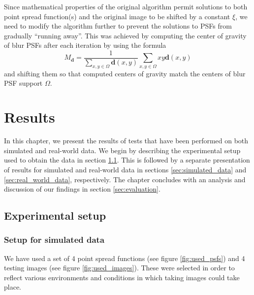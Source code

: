 \documentclass[12pt,notitlepage]{report}
\begin{document}
Since mathematical properties of the original algorithm permit solutions to both point spread function(s) and the original image to be shifted by a constant $\xi$, we need to modify the algorithm further to prevent the solutions to PSFs from  gradually ``running away''. This was achieved by computing the center of gravity of blur PSFs after each iteration by using the formula
\begin{equation}
\label{eq:srou03_cog}
	M_\mathbf{d} = \frac{1}{\sum_{x,y \in \Omega}\mathbf{d}(x,y) } \sum_{x,y \in \Omega} x y \mathbf{d}(x,y)
\end{equation}
and shifting them so that computed centers of gravity match the centers of blur PSF support $\Omega$.    

\chapter{Results}
\label{chap:results}

In this chapter, we present the results of tests that have been performed on both simulated and real-world data. We begin by describing the experimental setup used to obtain the data in section \ref{sec:experimental_setup}. This is followed by a separate presentation of results for simulated and real-world data in sections \ref{sec:simulated_data} and \ref{sec:real_world_data}, respectively. The chapter concludes with an analysis and discussion of our findings in section \ref{sec:evaluation}.

\clearpage

\section{Experimental setup}
\label{sec:experimental_setup}

\subsection{Setup for simulated data}
\label{sec:setup_for_simulated_data}

We have used a set of 4 point spread functions (see figure \ref{fig:used_psfs}) and 4 testing images (see figure \ref{fig:used_images}). These were selected in order to reflect various environments and conditions in which taking images could take place. 
\end{document}
